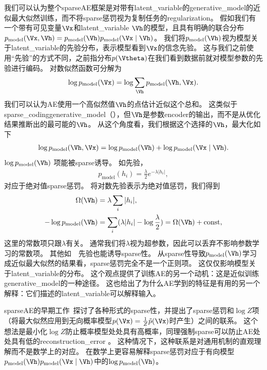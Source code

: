我们可以认为整个\gls{sparse}\gls{AE}框架是对带有\gls{latent_variable}的\gls{generative_model}的近似最大似然训练，而不将\gls{sparse}惩罚视为复制任务的\gls{regularization}。
假如我们有一个带有可见变量$\Vx$和\gls{latent_variable} $\Vh$的模型，且具有明确的联合分布$p_{\text{model}}(\Vx,\Vh)=p_{\text{model}}(\Vh)p_{\text{model}} (\Vx \mid \Vh)$。
我们将$p_{\text{model}}(\Vh)$视为模型关于\gls{latent_variable}的先验分布，表示模型看到$\Vx$的信念先验。
这与我们之前使用``先验''的方式不同，之前指分布$p(\Vtheta)$在我们看到数据前就对模型参数的先验进行编码。
对数似然函数可分解为
\begin{align}
\log p_{\text{model}}(\Vx)=\log \sum_{\Vh} p_{\text{model}}(\Vh, \Vx) .
\end{align}
我们可以认为\gls{AE}使用一个高似然值$\Vh$的点估计近似这个总和。
这类似于\gls{sparse_coding}\gls{generative_model}（），但$\Vh$是参数\gls{encoder}的输出，而不是从优化结果推断出的最可能的$\Vh$。
从这个角度看，我们根据这个选择的$\Vh$，最大化如下
\begin{align}
\log p_{\text{model}}(\Vh, \Vx)=\log p_{\text{model}}(\Vh) + \log p_{\text{model}}(\Vx \mid \Vh) .
\end{align}
$\log p_{\text{model}}(\Vh) $ 项能被\gls{sparse}诱导。
如先验，
\begin{align}
p_{\text{model}}(h_i) = \frac{\lambda}{2} e^{-\lambda | h_i |},
\end{align}
对应于绝对值\gls{sparse}惩罚。
将对数先验表示为绝对值惩罚，我们得到
\begin{align}
\Omega(\Vh) &= \lambda \sum_{i} | h_i  |,\\ 
-\log p_{\text{model}}(\Vh) &= 
\sum_i (\lambda | h_i | - \log \frac{\lambda}{2}) = \Omega(\Vh) + \text{const},
\end{align}
这里的常数项只跟$\lambda$有关。
通常我们将$\lambda$视为超参数，因此可以丢弃不影响参数学习的常数项。
其他如~~先验也能诱导\gls{sparse}性。
从\gls{sparse}性导致$p_{\text{model}}(\Vh)$学习成近似最大似然的结果看，\gls{sparse}惩罚完全不是一个正则项。
这仅仅影响模型关于\gls{latent_variable}的分布。
这个观点提供了训练\gls{AE}的另一个动机：这是近似训练\gls{generative_model}的一种途径。
这也给出了为什么\gls{AE}学到的特征是有用的另一个解释：它们描述的\gls{latent_variable}可以解释输入。


\gls{sparse}\gls{AE}的早期工作~\citep{ranzato-07-small,ranzato-08-small}探讨了各种形式的\gls{sparse}性，并提出了\gls{sparse}惩罚和$\log  Z$项（将最大似然应用到无向概率模型$p(\Vx)=\frac{1}{Z}\tilde{p}(\Vx)$时产生）之间的联系。
这个想法是最小化$\log Z$防止概率模型处处具有高概率，同理强制\gls{sparse}可以防止\gls{AE}处处具有低的\gls{reconstruction_error} 。
这种情况下，这种联系是对通用机制的直观理解而不是数学上的对应。
在数学上更容易解释\gls{sparse}惩罚对应于有向模型$p_{\text{model}}(\Vh)p_{\text{model}}(\Vx \mid \Vh) $中的$\log p_{\text{model}}(\Vh)$。


